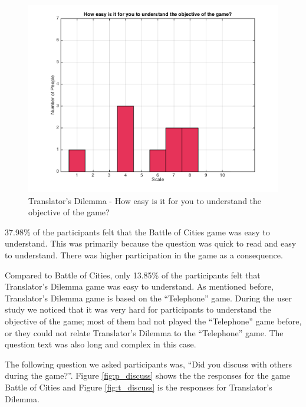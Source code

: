 \documentclass{sig-alternate}
\begin{document}
\begin{figure}
	\includegraphics[width=\linewidth]{t_easy_understand.png}
	\caption{Translator's Dilemma - How easy is it for you to understand the objective of the game?}
	\label{fig:t_easy_understand}
\end{figure}

37.98\% of the participants felt that the Battle of Cities game was easy to understand. This was primarily because the question was quick to read and easy to understand. There was higher participation in the game as a consequence.

Compared to Battle of Cities, only 13.85\% of the participants felt that Translator's Dilemma game was easy to understand. As mentioned before, Translator's Dilemma game is based on the ``Telephone'' game. During the user study we noticed that it was very hard for participants to understand the objective of the game; most of them had not played the ``Telephone'' game before, or they could not relate Translator's Dilemma to the ``Telephone'' game. The question text was also long and complex in this case.

The following question we asked participants was, ``Did you discuss with others during the game?''. Figure \ref{fig:p_discuss} shows the the responses for the game Battle of Cities and Figure \ref{fig:t_discuss} is the responses for Translator's Dilemma.
\end{document}
